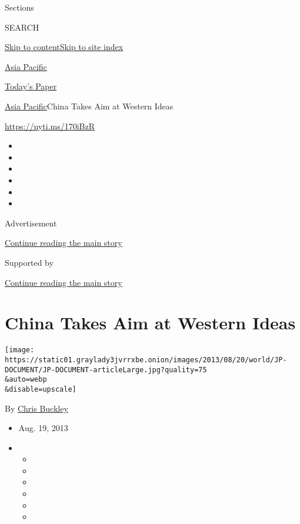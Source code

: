 Sections

SEARCH

\protect\hyperlink{site-content}{Skip to
content}\protect\hyperlink{site-index}{Skip to site index}

\href{https://www.nytimes3xbfgragh.onion/section/world/asia}{Asia
Pacific}

\href{https://myaccount.nytimes3xbfgragh.onion/auth/login?response_type=cookie\&client_id=vi}{}

\href{https://www.nytimes3xbfgragh.onion/section/todayspaper}{Today's
Paper}

\href{/section/world/asia}{Asia Pacific}\textbar{}China Takes Aim at
Western Ideas

\url{https://nyti.ms/170iBzR}

\begin{itemize}
\item
\item
\item
\item
\item
\item
\end{itemize}

Advertisement

\protect\hyperlink{after-top}{Continue reading the main story}

Supported by

\protect\hyperlink{after-sponsor}{Continue reading the main story}

\hypertarget{china-takes-aim-at-western-ideas}{%
\section{China Takes Aim at Western
Ideas}\label{china-takes-aim-at-western-ideas}}

\texttt{[image: https://static01.graylady3jvrrxbe.onion/images/2013/08/20/world/JP-DOCUMENT/JP-DOCUMENT-articleLarge.jpg?quality=75\\\&auto=webp\\\&disable=upscale]}

By \href{https://www.nytimes3xbfgragh.onion/by/chris-buckley}{Chris
Buckley}

\begin{itemize}
\item
  Aug. 19, 2013
\item
  \begin{itemize}
  \item
  \item
  \item
  \item
  \item
  \item
  \end{itemize}
\end{itemize}

